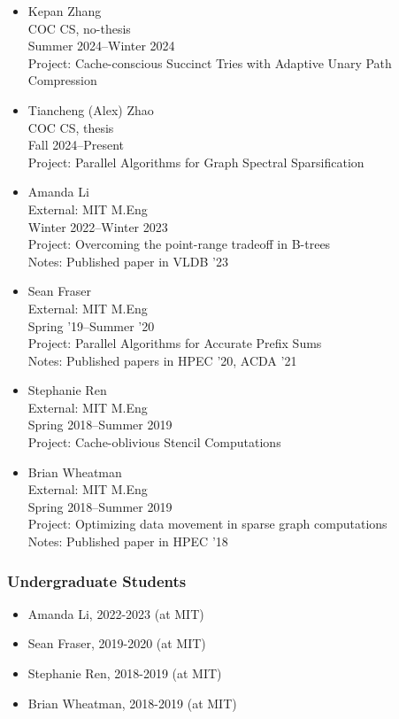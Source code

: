 \begin{adjustwidth}{2em}{0pt}
\begin{itemize}
    \item Kepan Zhang \\
        COC CS, no-thesis \\
        Summer 2024--Winter 2024 \\
        Project: Cache-conscious Succinct Tries with Adaptive Unary Path
Compression
    \item Tiancheng (Alex) Zhao \\
        COC CS, thesis \\
        Fall 2024--Present \\
        Project: Parallel Algorithms for Graph Spectral Sparsification
    \item Amanda Li \\
        External: MIT M.Eng \\
        Winter 2022--Winter 2023 \\
        Project: Overcoming the point-range tradeoff in B-trees\\
        Notes: Published paper in VLDB '23
    \item Sean Fraser \\
        External: MIT M.Eng \\
        Spring '19--Summer '20 \\
        Project: Parallel Algorithms for Accurate Prefix Sums\\
        Notes: Published papers in HPEC '20, ACDA '21
    \item Stephanie Ren \\
        External: MIT M.Eng \\
        Spring 2018--Summer 2019 \\
        Project: Cache-oblivious Stencil Computations
    \item Brian Wheatman \\
        External: MIT M.Eng \\
        Spring 2018--Summer 2019 \\
        Project: Optimizing data movement in sparse graph computations\\
        Notes: Published paper in HPEC '18
        \end{itemize}

\subsubsection{Undergraduate Students}

\begin{itemize}
\item Amanda Li, 2022-2023 (at MIT)
    \item Sean Fraser, 2019-2020 (at MIT)
    \item Stephanie Ren, 2018-2019 (at MIT)
    \item Brian Wheatman, 2018-2019 (at MIT)
\end{itemize}


\end{adjustwidth}
